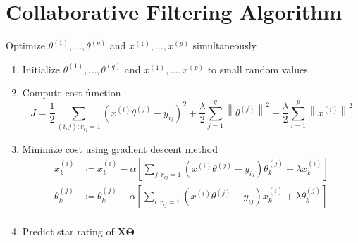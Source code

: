 \section{Collaborative Filtering Algorithm}
Optimize $\theta^{(1)}, \dots, \theta^{(q)}$ and $x^{(1)}, \dots, x^{(p)}$ simultaneously
\begin{enumerate}
    \item Initialize $\theta^{(1)}, \dots, \theta^{(q)}$ and $x^{(1)}, \dots, x^{(p)}$ to small random values
    \item Compute cost function
    \begin{equation}
        J = \frac{1}{2}\sum_{(i,j):r_{ij}=1}\left(x^{(i)} \theta^{(j)} - y_{ij}\right)^2 + \frac{\lambda}{2}\sum_{j=1}^{q} \left\|\theta^{(j)}\right\|^2 + \frac{\lambda}{2}\sum_{i=1}^{p} \left\|x^{(i)}\right\|^2
    \end{equation}

    \item Minimize cost using gradient descent method
    \begin{equation}
        \begin{aligned}
            x_k^{(i)}      &\coloneqq x_k^{(i)}      - \alpha \left[\sum_{j:r_{ij}=1}\left(x^{(i)} \theta^{(j)} - y_{ij}\right)\theta_k^{(j)} + \lambda x_k^{(i)}     \right]\\
            \theta_k^{(j)} &\coloneqq \theta_k^{(j)} - \alpha \left[\sum_{i:r_{ij}=1}\left(x^{(i)} \theta^{(j)} - y_{ij}\right)x_k^{(i)}      + \lambda\theta_k^{(j)} \right]\\
        \end{aligned}
    \end{equation}

    \item Predict star rating of $\mathbf{X}\mathbf{\Theta}$

\end{enumerate}


